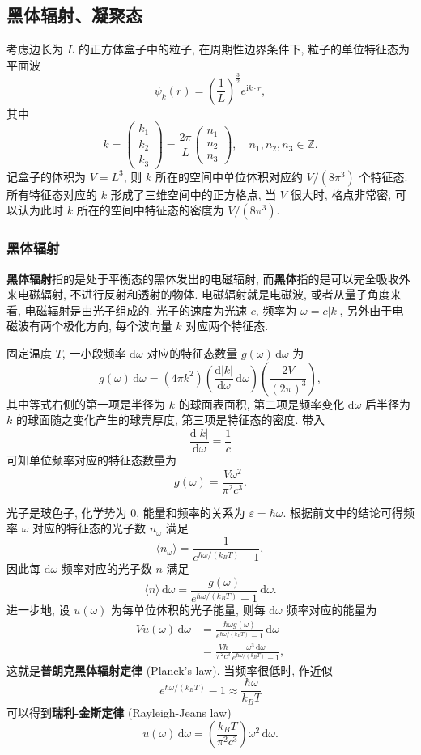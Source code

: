 \subsection{黑体辐射、凝聚态}
考虑边长为 $ L $ 的正方体盒子中的粒子, 在周期性边界条件下, 粒子的单位特征态为平面波
\[ \psi_k(r)=\left(\frac{1}{L}\right)^{\frac{3}{2}}e^{\mathrm{i}k\cdot r}, \]
其中
\[ k=\left(\begin{matrix}
    k_1\\k_2\\k_3
\end{matrix}\right)=\frac{2\pi}{L}\left(\begin{matrix}
    n_1\\n_2\\n_3
\end{matrix}\right),\quad n_1,n_2,n_3\in\mathbb{Z}. \]
记盒子的体积为 $ V=L^3 $, 则 $ k $ 所在的空间中单位体积对应约 $ V/(8\pi^3) $ 个特征态. 所有特征态对应的 $ k $ 形成了三维空间中的正方格点, 当 $ V $ 很大时, 格点非常密, 可以认为此时 $ k $ 所在的空间中特征态的密度为 $ V/(8\pi^3) $.
\subsubsection*{黑体辐射}
{\bf 黑体辐射}指的是处于平衡态的黑体发出的电磁辐射, 而{\bf 黑体}指的是可以完全吸收外来电磁辐射, 不进行反射和透射的物体. 电磁辐射就是电磁波, 或者从量子角度来看, 电磁辐射是由光子组成的. 光子的速度为光速 $ c $, 频率为 $ \omega=c|k| $, 另外由于电磁波有两个极化方向, 每个波向量 $ k $ 对应两个特征态.

固定温度 $ T $, 一小段频率 $ \mathrm{d}\omega $ 对应的特征态数量 $ g(\omega)\,\mathrm{d}\omega $ 为
\[ g(\omega)\,\mathrm{d}\omega=(4\pi k^2)\left( \frac{\mathrm{d}|k|}{\mathrm{d}\omega}\,\mathrm{d}\omega \right)\left( \frac{2V}{(2\pi)^3} \right), \]
其中等式右侧的第一项是半径为 $ k $ 的球面表面积, 第二项是频率变化 $ \mathrm{d}\omega $ 后半径为 $ k $ 的球面随之变化产生的球壳厚度, 第三项是特征态的密度. 带入 
\[ \frac{\mathrm{d}|k|}{\mathrm{d}\omega}=\frac{1}{c} \] 
可知单位频率对应的特征态数量为
\[ g(\omega)=\frac{V\omega^2}{\pi^2c^3}. \]

光子是玻色子, 化学势为 $ 0 $, 能量和频率的关系为 $ \varepsilon=\hbar\omega $. 根据前文中的结论可得频率 $\omega$ 对应的特征态的光子数 $n_\omega$ 满足
\[ \langle n_\omega\rangle=\frac{1}{e^{\hbar\omega/(k_BT)}-1}, \]
因此每 $ \mathrm{d}\omega $ 频率对应的光子数 $n$ 满足
\[ \langle n\rangle\,\mathrm{d}\omega=\frac{g(\omega)}{e^{\hbar\omega/(k_BT)}-1}\,\mathrm{d}\omega. \]
进一步地, 设 $ u(\omega) $ 为每单位体积的光子能量, 则每 $\mathrm{d}\omega$ 频率对应的能量为
\begin{align*}
    Vu(\omega)\,\mathrm{d}\omega &= \frac{\hbar\omega g(\omega)}{e^{\hbar\omega/(k_BT)}-1}\,\mathrm{d}\omega\\ 
    &=\frac{V\hbar}{\pi^2c^3}\frac{\omega^3\,\mathrm{d}\omega}{e^{\hbar\omega/(k_BT)}-1},
\end{align*}
这就是{\bf 普朗克黑体辐射定律} (Planck's law). 当频率很低时, 作近似 
\[ e^{\hbar\omega/(k_BT)}-1\approx\frac{\hbar\omega}{k_BT} \]
可以得到{\bf 瑞利-金斯定律} (Rayleigh-Jeans law)
\[ u(\omega)\,\mathrm{d}\omega= \left(\frac{k_BT}{\pi^2c^3}\right)\omega^2\,\mathrm{d}\omega. \]

